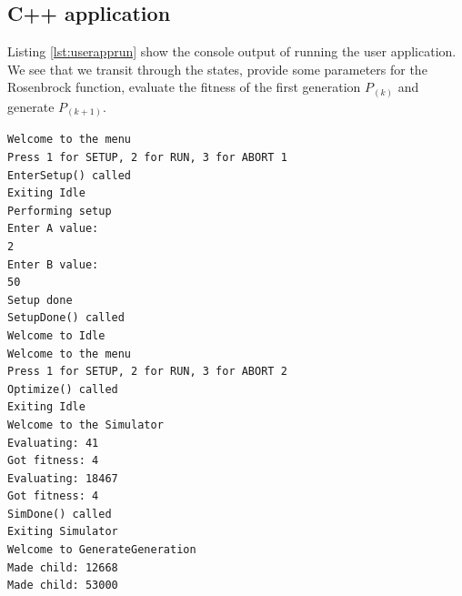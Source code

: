 \subsection{C++ application}

Listing \ref{lst:userapprun} show the console output of running the user application. We see that we transit through the states, provide some parameters for the Rosenbrock function, evaluate the fitness of the first generation $P_{(k)}$ and generate $P_{(k+1)}$.

\begin{lstlisting}[caption=Running the user application.,label={lst:userapprun},frame=single]
Welcome to the menu
Press 1 for SETUP, 2 for RUN, 3 for ABORT 1
EnterSetup() called
Exiting Idle
Performing setup
Enter A value:
2
Enter B value:
50
Setup done
SetupDone() called
Welcome to Idle
Welcome to the menu
Press 1 for SETUP, 2 for RUN, 3 for ABORT 2
Optimize() called
Exiting Idle
Welcome to the Simulator
Evaluating: 41
Got fitness: 4
Evaluating: 18467
Got fitness: 4
SimDone() called
Exiting Simulator
Welcome to GenerateGeneration
Made child: 12668
Made child: 53000
\end{lstlisting}
